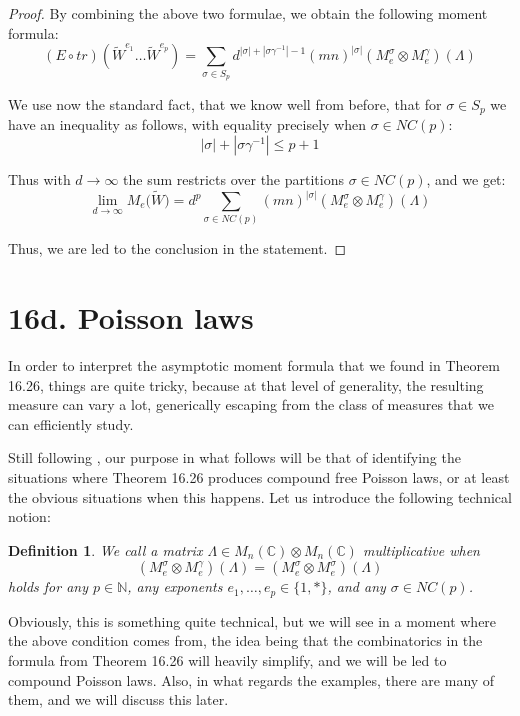 \documentclass[12pt]{amsbook}
\newtheorem{definition}[theorem]{Definition}
\begin{document}
\begin{proof}
By combining the above two formulae, we obtain the following moment formula:
$$(E\circ tr)(\widetilde{W}^{e_1}\ldots\widetilde{W}^{e_p})
=\sum_{\sigma\in S_p}d^{|\sigma|+|\sigma\gamma^{-1}|-1}(mn)^{|\sigma|}(M^\sigma_e\otimes M^\gamma_e)(\Lambda)$$

We use now the standard fact, that we know well from before, that for $\sigma\in S_p$ we have an inequality as follows, with equality precisely when $\sigma\in NC(p)$:
$$|\sigma|+|\sigma\gamma^{-1}|\leq p+1$$

Thus with $d\to\infty$ the sum restricts over the partitions $\sigma\in NC(p)$, and we get:
$$\lim_{d\to\infty}M_e\big(\widetilde{W}\big)=d^p\sum_{\sigma\in NC(p)}(mn)^{|\sigma|}(M^\sigma_e\otimes M^\gamma_e)(\Lambda)$$

Thus, we are led to the conclusion in the statement.
\end{proof}

\section*{16d. Poisson laws}

In order to interpret the asymptotic moment formula that we found in Theorem 16.26, things are quite tricky, because at that level of generality, the resulting measure can vary a lot, generically escaping from the class of measures that we can efficiently study.

\bigskip

Still following \cite{bn2}, our purpose in what follows will be that of identifying the situations where Theorem 16.26 produces compound free Poisson laws, or at least the obvious situations when this happens. Let us introduce the following technical notion:


\begin{definition}
We call a matrix $\Lambda\in M_n(\mathbb C)\otimes M_n(\mathbb C)$ multiplicative when
$$(M^\sigma_e\otimes M^\gamma_e)(\Lambda)=(M^\sigma_e\otimes M^\sigma_e)(\Lambda)$$
holds for any $p\in\mathbb N$, any exponents $e_1,\ldots,e_p\in\{1,*\}$, and any $\sigma\in NC(p)$.
\end{definition}

Obviously, this is something quite technical, but we will see in a moment where the above condition comes from, the idea being that the combinatorics in the formula from Theorem 16.26 will heavily simplify, and we will be led to compound Poisson laws. Also, in what regards the examples, there are many of them, and we will discuss this later.
\end{document}
